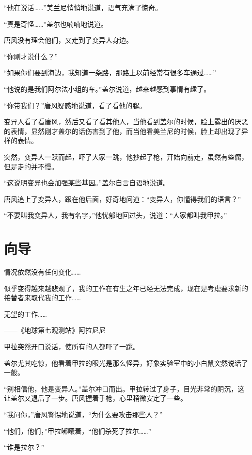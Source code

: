 “他在说话……”美兰尼悄悄地说道，语气充满了惊奇。

“真是奇怪……”盖尔也喃喃地说道。

唐风没有理会他们，又走到了变异人身边。

“你刚才说什么？”

“如果你们要到海边，我知道一条路，那路上以前经常有很多车通过……”

“他说的是我们阿尔法小组的车。”盖尔说道，越来越感到事情有趣了。

“你带我们？”唐风疑惑地说道，看了看他的腿。

变异人看了看唐风，然后又看了看其他人，当他看到盖尔的时候，脸上露出的厌恶的表情，显然刚才盖尔的话伤害到了他，而当他看美兰尼的时候，脸上却出现了异样的表情。

突然，变异人一跃而起，吓了大家一跳，他抄起了枪，开始向前走，虽然有些瘸，但是走的并不慢。

“这说明变异也会加强某些基因。”盖尔自言自语地说道。

唐风追上了变异人，跟在他后面，好奇地问道：“变异人，你懂得我们的语言？”

“不要叫我变异人，我有名字，”他忧郁地回过头，说道：“人家都叫我甲拉。”

\chapter{向导}

\begin{myquote}
情况依然没有任何变化……

似乎变得越来越悲观了，我的工作在有生之年已经无法完成，现在是考虑要求新的接替者来取代我的工作……

无望的工作……
\end{myquote}

\begin{myflushright}
——《地球第七观测站》阿拉尼尼
\end{myflushright}

甲拉突然开口说话，使所有的人都吓了一跳。

盖尔尤其吃惊，他看着甲拉的眼光是那么怪异，好象实验室中的小白鼠突然说话了一般。

“别相信他，他是变异人。”盖尔冲口而出。甲拉转过了身子，目光非常的阴沉，这让盖尔又退后了一步。唐风握着手枪，心里稍微安定了一些。

“我问你，”唐风警惕地说道，“为什么要攻击那些人？”

“他们，他们，”甲拉嘟囔着，“他们杀死了拉尔……”

“谁是拉尔？”

